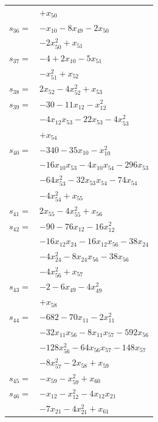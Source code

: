 \begin{longtable}{@{}r@{\;}l@{}}
 & \(\displaystyle +x_{50}\) \\[3pt]
\(s_{36}=\) & \(\displaystyle -x_{10} -8x_{49} -2x_{50}\) \\
 & \(\displaystyle -2x_{50}^{2} +x_{51}\) \\[3pt]
\(s_{37}=\) & \(\displaystyle -4 +2x_{10} -5x_{51}\) \\
 & \(\displaystyle -x_{51}^{2} +x_{52}\) \\[3pt]
\(s_{38}=\) & \(\displaystyle 2x_{52} -4x_{52}^{2} +x_{53}\) \\[3pt]
\(s_{39}=\) & \(\displaystyle -30 -11x_{12} -x_{12}^{2}\) \\
 & \(\displaystyle -4x_{12}x_{53} -22x_{53} -4x_{53}^{2}\) \\
 & \(\displaystyle +x_{54}\) \\[3pt]
\(s_{40}=\) & \(\displaystyle -340 -35x_{10} -x_{10}^{2}\) \\
 & \(\displaystyle -16x_{10}x_{53} -4x_{10}x_{54} -296x_{53}\) \\
 & \(\displaystyle -64x_{53}^{2} -32x_{53}x_{54} -74x_{54}\) \\
 & \(\displaystyle -4x_{54}^{2} +x_{55}\) \\[3pt]
\(s_{41}=\) & \(\displaystyle 2x_{55} -4x_{55}^{2} +x_{56}\) \\[3pt]
\(s_{42}=\) & \(\displaystyle -90 -76x_{12} -16x_{12}^{2}\) \\
 & \(\displaystyle -16x_{12}x_{24} -16x_{12}x_{56} -38x_{24}\) \\
 & \(\displaystyle -4x_{24}^{2} -8x_{24}x_{56} -38x_{56}\) \\
 & \(\displaystyle -4x_{56}^{2} +x_{57}\) \\[3pt]
\(s_{43}=\) & \(\displaystyle -2 -6x_{49} -4x_{49}^{2}\) \\
 & \(\displaystyle +x_{58}\) \\[3pt]
\(s_{44}=\) & \(\displaystyle -682 -70x_{11} -2x_{11}^{2}\) \\
 & \(\displaystyle -32x_{11}x_{56} -8x_{11}x_{57} -592x_{56}\) \\
 & \(\displaystyle -128x_{56}^{2} -64x_{56}x_{57} -148x_{57}\) \\
 & \(\displaystyle -8x_{57}^{2} -2x_{58} +x_{59}\) \\[3pt]
\(s_{45}=\) & \(\displaystyle -x_{59} -x_{59}^{2} +x_{60}\) \\[3pt]
\(s_{46}=\) & \(\displaystyle -x_{12} -x_{12}^{2} -4x_{12}x_{21}\) \\
 & \(\displaystyle -7x_{21} -4x_{21}^{2} +x_{61}\) \\[3pt]

\end{longtable}
